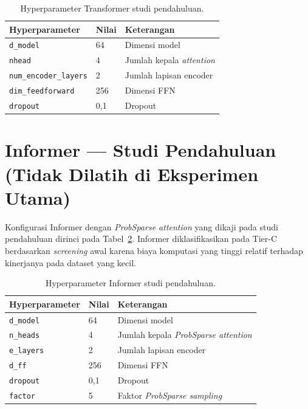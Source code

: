 \begin{table}[ht]
  \centering
  \caption{Hyperparameter Transformer studi pendahuluan.}
  \label{tab:lampB_transformer_arch}
  \small
  \begin{tabular}{@{}lll@{}}
    \toprule
    \textbf{Hyperparameter} & \textbf{Nilai} & \textbf{Keterangan} \\
    \midrule
    \texttt{d\_model} & 64 & Dimensi model \\
    \texttt{nhead} & 4 & Jumlah kepala \emph{attention} \\
    \texttt{num\_encoder\_layers} & 2 & Jumlah lapisan encoder \\
    \texttt{dim\_feedforward} & 256 & Dimensi FFN \\
    \texttt{dropout} & 0,1 & Dropout \\
    \bottomrule
  \end{tabular}
\end{table}

\section{Informer --- Studi Pendahuluan (Tidak Dilatih di Eksperimen Utama)}
\label{lamp:hparam_informer}

Konfigurasi Informer dengan \emph{ProbSparse attention} yang dikaji pada studi
pendahuluan dirinci pada Tabel~\ref{tab:lampB_informer_arch}. Informer
diklasifikasikan pada Tier-C berdasarkan \emph{screening} awal karena biaya
komputasi yang tinggi relatif terhadap kinerjanya pada dataset yang kecil.

\begin{table}[ht]
  \centering
  \caption{Hyperparameter Informer studi pendahuluan.}
  \label{tab:lampB_informer_arch}
  \small
  \begin{tabular}{@{}lll@{}}
    \toprule
    \textbf{Hyperparameter} & \textbf{Nilai} & \textbf{Keterangan} \\
    \midrule
    \texttt{d\_model} & 64 & Dimensi model \\
    \texttt{n\_heads} & 4 & Jumlah kepala \emph{ProbSparse attention} \\
    \texttt{e\_layers} & 2 & Jumlah lapisan encoder \\
    \texttt{d\_ff} & 256 & Dimensi FFN \\
    \texttt{dropout} & 0,1 & Dropout \\
    \texttt{factor} & 5 & Faktor \emph{ProbSparse sampling} \\
    \bottomrule
  \end{tabular}
\end{table}
